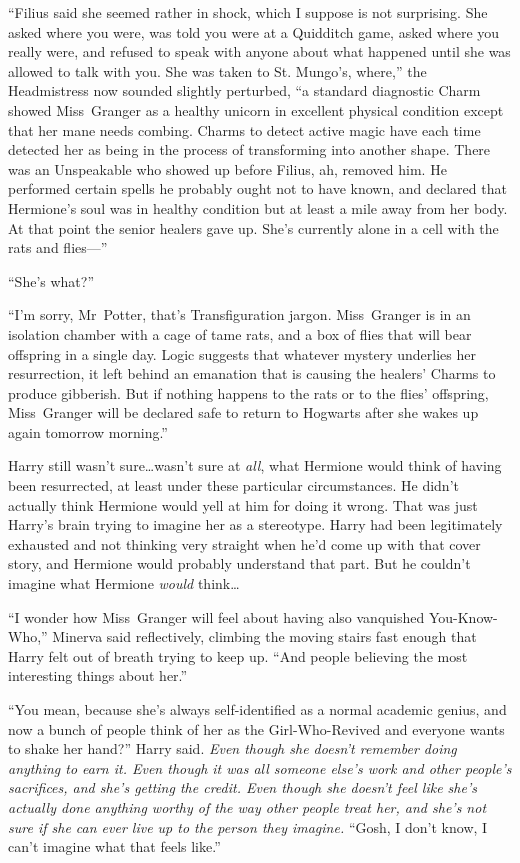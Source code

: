 “Filius said she seemed rather in shock, which I suppose is not surprising. She asked where you were, was told you were at a Quidditch game, asked where you really were, and refused to speak with anyone about what happened until she was allowed to talk with you. She was taken to St. Mungo’s, where,” the Headmistress now sounded slightly perturbed, “a standard diagnostic Charm showed Miss~Granger as a healthy unicorn in excellent physical condition except that her mane needs combing. Charms to detect active magic have each time detected her as being in the process of transforming into another shape. There was an Unspeakable who showed up before Filius, ah, removed him. He performed certain spells he probably ought not to have known, and declared that Hermione’s soul was in healthy condition but at least a mile away from her body. At that point the senior healers gave up. She’s currently alone in a cell with the rats and flies—”

“She’s what?”

“I’m sorry, Mr~Potter, that’s Transfiguration jargon. Miss~Granger is in an isolation chamber with a cage of tame rats, and a box of flies that will bear offspring in a single day. Logic suggests that whatever mystery underlies her resurrection, it left behind an emanation that is causing the healers’ Charms to produce gibberish. But if nothing happens to the rats or to the flies’ offspring, Miss~Granger will be declared safe to return to Hogwarts after she wakes up again tomorrow morning.”

Harry still wasn’t sure…wasn’t sure at \emph{all}, what Hermione would think of having been resurrected, at least under these particular circumstances. He didn’t actually think Hermione would yell at him for doing it wrong. That was just Harry’s brain trying to imagine her as a stereotype. Harry had been legitimately exhausted and not thinking very straight when he’d come up with that cover story, and Hermione would probably understand that part. But he couldn’t imagine what Hermione \emph{would} think…

“I wonder how Miss~Granger will feel about having also vanquished You-Know-Who,” Minerva said reflectively, climbing the moving stairs fast enough that Harry felt out of breath trying to keep up. “And people believing the most interesting things about her.”

“You mean, because she’s always self-identified as a normal academic genius, and now a bunch of people think of her as the Girl-Who-Revived and everyone wants to shake her hand?” Harry said. \emph{Even though she doesn’t remember doing anything to earn it. Even though it was all someone else’s work and other people’s sacrifices, and she’s getting the credit. Even though she doesn’t feel like she’s actually done anything worthy of the way other people treat her, and she’s not sure if she can ever live up to the person they imagine.} “Gosh, I don’t know, I can’t imagine what that feels like.”

